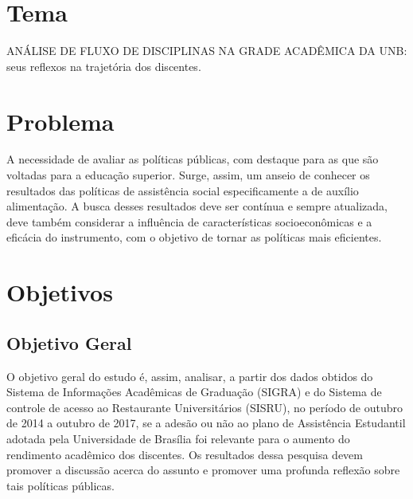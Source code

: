 \section{Tema}%
ANÁLISE DE FLUXO DE DISCIPLINAS NA GRADE ACADÊMICA DA UNB: seus reflexos na trajetória dos discentes.

\section{Problema}%
A necessidade de avaliar as políticas públicas, com destaque para as que são voltadas para a educação superior. Surge, assim, um anseio de conhecer os resultados das políticas de assistência social especificamente a de auxílio alimentação. A busca desses resultados deve ser contínua e sempre atualizada, deve também considerar a influência de características socioeconômicas e a eficácia do instrumento, com o objetivo de tornar as políticas mais eficientes.

\section{Objetivos}%

\subsection{Objetivo Geral}
O objetivo geral do estudo é, assim, analisar, a partir dos dados obtidos do Sistema de Informações Acadêmicas de Graduação (SIGRA) e do Sistema de controle de acesso ao Restaurante Universitários (SISRU), no período de outubro de 2014 a outubro de 2017, se a adesão ou não ao plano de Assistência Estudantil adotada pela Universidade de Brasília foi relevante para o aumento do rendimento acadêmico dos discentes. Os resultados dessa pesquisa devem promover a discussão acerca do assunto e promover uma profunda reflexão sobre tais políticas públicas.

